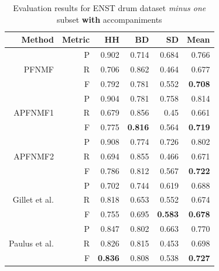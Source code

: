 \documentclass{article}
\begin{document}
\begin{table}[t]
\begin{footnotesize}
\centering
\begin{tabular*}{\textwidth}{@{\extracolsep{\stretch{1}}}*{6}{r}@{}}%
\hline
Method                         & Metric & HH             & BD             & SD             & Mean           \\ \hline
\multirow{3}{*}{PFNMF}         & P      & 0.902          & 0.714          & 0.684          & 0.766          \\
                               & R      & 0.706          & 0.862          & 0.464          & 0.677          \\
                               & F      & 0.792          & 0.781          & 0.552          & \textbf{0.708} \\ \hline
\multirow{3}{*}{APFNMF1}       & P      & 0.904          & 0.781          & 0.758          & 0.814          \\
                               & R      & 0.679          & 0.856          & 0.45           & 0.661          \\
                               & F      & 0.775          & \textbf{0.816} & 0.564          & \textbf{0.719} \\ \hline
\multirow{3}{*}{APFNMF2}       & P      & 0.908          & 0.774          & 0.726          & 0.802          \\
                               & R      & 0.694          & 0.855          & 0.466          & 0.671          \\
                               & F      & 0.786          & 0.812          & 0.567          & \textbf{0.722} \\ \hline
\multirow{3}{*}{Gillet et al.\cite{gillet_transcription_2008}} & P      & 0.702          & 0.744          & 0.619          & 0.688          \\
                               & R      & 0.818          & 0.653          & 0.552          & 0.674          \\
                               & F      & 0.755          & 0.695          & \textbf{0.583} & \textbf{0.678} \\ \hline
\multirow{3}{*}{Paulus et al.\cite{Paulus2009a}} & P      & 0.847          & 0.802          & 0.663          & 0.770          \\
                               & R      & 0.826          & 0.815          & 0.453          & 0.698          \\
                               & F      & \textbf{0.836} & 0.808          & 0.538          & \textbf{0.727} \\ \hline
\end{tabular*}
\end{footnotesize}
\caption{Evaluation results for ENST drum dataset \textit{minus one} subset \textbf{with} accompaniments}\label{results2}
\end{table}
\end{document}
